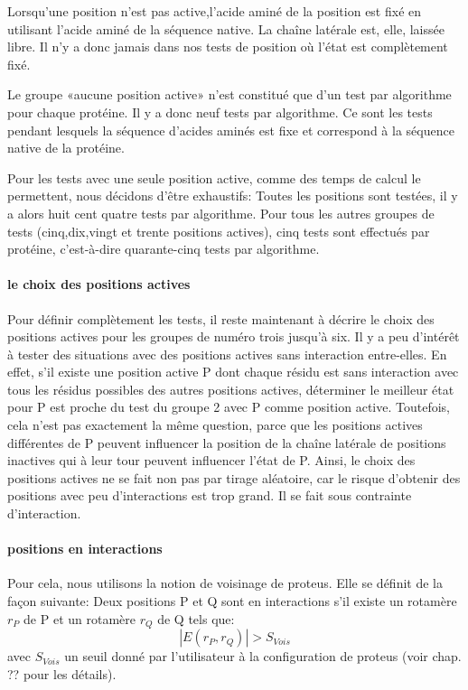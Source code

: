 Lorsqu'une position n'est pas active,l'acide aminé de la position est fixé en utilisant l'acide aminé de la séquence native. La chaîne latérale est, elle, laissée libre. Il n'y a donc jamais dans nos tests de position où l'état est complètement fixé.

Le groupe «aucune position active» n'est constitué que d'un test par algorithme pour chaque protéine. Il y a donc neuf tests par algorithme.
Ce sont les tests pendant lesquels la séquence d'acides aminés est fixe et correspond à la séquence native de la protéine.

Pour les tests avec une seule position active, comme des temps de calcul le permettent, nous décidons d'être exhaustifs:
Toutes les positions sont testées, il y a alors huit cent quatre tests par algorithme.
Pour tous les autres groupes de tests (cinq,dix,vingt et trente positions actives), cinq tests sont effectués par protéine, c'est-à-dire quarante-cinq tests par algorithme.

\paragraph{le choix des positions actives}
\label{para:choix_posi}
Pour définir complètement les tests, il reste maintenant à décrire le choix des positions actives pour les groupes de numéro trois jusqu'à six.
Il y a peu d'intérêt à tester des situations avec des positions actives sans interaction entre-elles.
En effet, s'il existe une position active P dont chaque résidu est sans interaction avec tous les résidus possibles des autres positions actives, déterminer le meilleur état pour P est proche du test du groupe 2 avec P comme position active. Toutefois, cela n'est pas exactement la même question, parce que les positions actives différentes de P peuvent influencer la position de la chaîne latérale de positions inactives qui à leur tour peuvent influencer l'état de P.
Ainsi, le choix des positions actives ne se fait non pas par tirage aléatoire, car le risque d'obtenir des positions avec peu d'interactions est trop grand. Il se fait sous contrainte d'interaction.

\paragraph{positions en interactions}
Pour cela, nous utilisons la notion de voisinage de proteus. Elle se définit de la façon suivante:  
Deux positions P et Q sont en interactions s'il existe un rotamère $r_P$ de P et un rotamère $r_Q$ de Q tels que:
\begin{displaymath}
 | E(r_P,r_Q) | > S_{Vois}
\end{displaymath} 
avec $S_{Vois}$ un seuil donné par l'utilisateur à la configuration de proteus (voir chap. ?? pour les détails).

